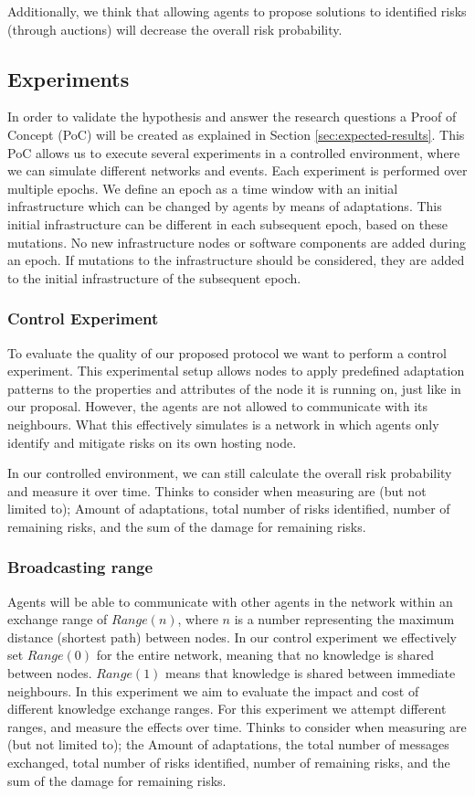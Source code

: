 Additionally, we think that allowing agents to propose solutions to identified risks (through auctions) will decrease the overall risk probability. 


\subsection{Experiments} \label{ssec:experiments}
In order to validate the hypothesis and answer the research questions a Proof of Concept (PoC) will be created as explained in Section \ref{sec:expected-results}. This PoC allows us to execute several experiments in a controlled environment, where we can simulate different networks and events. Each experiment is performed over multiple epochs. We define an epoch as a time window with an initial infrastructure which can be changed by agents by means of adaptations. This initial infrastructure can be different in each subsequent epoch, based on these mutations. No new infrastructure nodes or software components are added during an epoch. If mutations to the infrastructure should be considered, they are added to the initial infrastructure of the subsequent epoch.

\subsubsection{Control Experiment} 
To evaluate the quality of our proposed protocol we want to perform a control experiment. This experimental setup allows nodes to apply predefined adaptation patterns to the properties and attributes of the node it is running on, just like in our proposal. However, the agents are not allowed to communicate with its neighbours. What this effectively simulates is a network in which agents only identify and mitigate risks on its own hosting node. 

In our controlled environment, we can still calculate the overall risk probability and measure it over time. Thinks to consider when measuring are (but not limited to); Amount of adaptations, total number of risks identified, number of remaining risks, and the sum of the damage for remaining risks.

\subsubsection{Broadcasting range}
Agents will be able to communicate with other agents in the network within an exchange range of \( Range(n) \), where \(n\) is a number representing the maximum distance (shortest path) between nodes. In our control experiment we effectively set \( Range(0) \) for the entire network, meaning that no knowledge is shared between nodes. \( Range(1) \) means that knowledge is shared between immediate neighbours. 
In this experiment we aim to evaluate the impact and cost of different knowledge exchange ranges. For this experiment we attempt different ranges, and measure the effects over time. Thinks to consider when measuring are (but not limited to); the Amount of adaptations, the total number of messages exchanged, total number of risks identified, number of remaining risks, and the sum of the damage for remaining risks.

